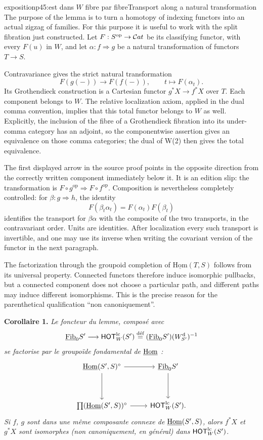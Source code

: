 \begin{dcomment}{exposition}{p45:est dans $W$ fibre par fibre}{Transport along a natural transformation}
The purpose of the lemma is to turn a homotopy of indexing functors into an actual zigzag of families. For this purpose it is useful to work with the split fibration just constructed. Let $F:S^{\mathrm{op}}\to\mathcal{C}at$ be its classifying functor, with every $F(u)$ in $W$, and let $\alpha:f\Rightarrow g$ be a natural transformation of functors $T\to S$.

Contravariance gives the strict natural transformation
\[
 F(g(-))\longrightarrow F(f(-)),\qquad
 t\longmapsto F(\alpha_t).
\]
Its Grothendieck construction is a Cartesian functor $g^*X\to f^*X$ over $T$. Each component belongs to $W$. The relative localization axiom, applied in the dual comma convention, implies that this total functor belongs to $W$ as well. Explicitly, the inclusion of the fibre of a Grothendieck fibration into its under-comma category has an adjoint, so the componentwise assertion gives an equivalence on those comma categories; the dual of W(2) then gives the total equivalence.

The first displayed arrow in the source proof points in the opposite direction from the correctly written component immediately below it. It is an edition slip: the transformation is $F\circ g^{\mathrm{op}}\Rightarrow F\circ f^{\mathrm{op}}$. Composition is nevertheless completely controlled: for $\beta:g\Rightarrow h$, the identity
\[
 F(\beta_t\alpha_t)=F(\alpha_t)F(\beta_t)
\]
identifies the transport for $\beta\alpha$ with the composite of the two transports, in the contravariant order. Units are identities. After localization every such transport is invertible, and one may use its inverse when writing the covariant version of the functor in the next paragraph.

The factorization through the groupoid completion of $\underline{\mathrm{Hom}}(T,S)$ follows from its universal property. Connected functors therefore induce isomorphic pullbacks, but a connected component does not choose a particular path, and different paths may induce different isomorphisms. This is the precise reason for the parenthetical qualification ``non canoniquement''.
\end{dcomment}


\textbf{Corollaire 1.} \textit{Le foncteur du lemme, composé avec}
\[ \underline{\mathrm{Fib}}_0S'\longrightarrow\mathsf{HOT}^{\mathrm{lc}}_W(S')\overset{\text{déf}}{=}(\underline{\mathrm{Fib}}_0S')(W^{\mathrm{d}}_{S'})^{-1} \]
\textit{se factorise par le groupoïde fondamental de} $\underline{\operatorname{Hom}}$ \textit{:}
\[
\begin{tikzcd}[row sep=huge]
\uHom(S',S)^{\circ} \arrow[r] \arrow[d] & \uFib_0S' \arrow[d] \\
\textstyle\prod(\uHom(S',S))^{\circ} \arrow[r] & \HOT^{\mathrm{lc}}_W(S').
\end{tikzcd}
\]
\textit{Si $f$, $g$ sont dans une même composante connexe de $\underline{\operatorname{Hom}}(S',S)$, alors $f^*X$ et $g^*X$ sont isomorphes (non canoniquement, en général) dans} $\mathsf{HOT}^{\mathrm{lc}}_W(S')$.

